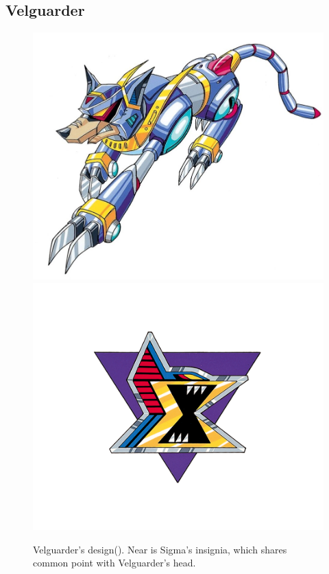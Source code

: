 \subsection{Velguarder}\label{boss:Velguarder}
\begin{figure}[htp]
	\centering
	\includegraphics[width=0.4\linewidth]{figures/X1/Sigma_stages/Velguarder.jpg}
	\includegraphics[width=0.4\linewidth]{figures/X1/Sigma_stages/Sigma_logo.png}
	\caption{Velguarder's design(\cite{book:MMX_Complete_art}). Near is Sigma's insignia, which shares common point with Velguarder's head.}
\end{figure}

